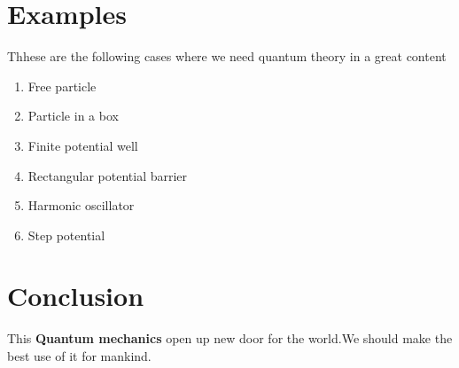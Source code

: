 \documentclass{article}
\begin{document}
\section{Examples}
Thhese are the following cases where we need quantum theory in a great content
\begin{enumerate}
\item Free particle
\item Particle in a box
\item Finite potential well
\item Rectangular potential barrier
\item Harmonic oscillator
\item Step potential
   
\end{enumerate}

\section{Conclusion}
This   \textbf{Quantum mechanics}  open up new door for the world.We should make the best use of it for mankind.
\end{document}
